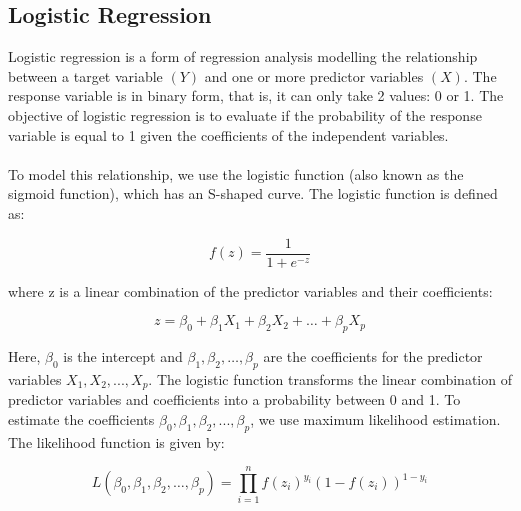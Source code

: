 \documentclass{article}[12pt]
\theoremstyle{definition}
\begin{document}
\newpage

\subsection{Logistic Regression}

\bigskip

Logistic regression is a form of regression analysis modelling the relationship between a target variable $(Y)$ and one or more predictor variables $(X)$. The response variable is in binary form, that is, it can only take 2 values: 0 or 1. The objective of logistic regression is to evaluate if the probability of the response variable is equal to 1 given the coefficients of the independent variables.
\\
\\
To model this relationship, we use the logistic function (also known as the sigmoid function), which has an S-shaped curve. The logistic function is defined as:

\medskip

$$ f(z) = \frac{1}{1+ e^{-z}} $$

\medskip

\noindent
where z is a linear combination of the predictor variables and their coefficients:

\medskip

$$ z = \beta_0 + \beta_1 X_1 + \beta_2 X_2 + \ldots + \beta_p X_p $$

\medskip

\noindent
Here, $\beta_0$ is the intercept and $\beta_1, \beta_2, \ldots, \beta_p$ are the coefficients for the predictor variables $X_1, X_2, ..., X_p$. The logistic function transforms the linear combination of predictor variables and coefficients into a probability between 0 and 1. To estimate the coefficients $\beta_0, \beta_1, \beta_2, ..., \beta_p$, we use maximum likelihood estimation. The likelihood function is given by:

$$L(\beta_0, \beta_1, \beta_2, \dots, \beta_p) = \prod_{i=1}^{n} f(z_i)^{y_i} (1 - f(z_i))^{1 - y_i}$$

\medskip
\end{document}
